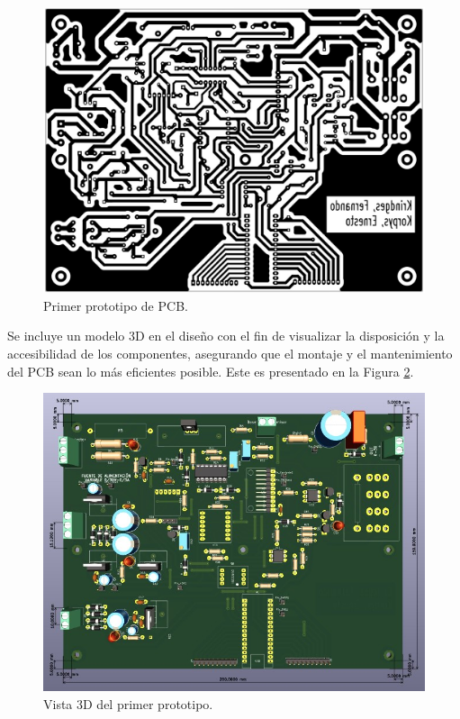 \begin{figure}[htbp]
    \centering
    \includegraphics[width=\textwidth]{./imagenes/pcb_v1.jpg}
    \caption{Primer prototipo de PCB.}
    \label{F:PCB_V1}
\end{figure} \par

Se incluye un modelo 3D en el diseño con el fin de visualizar la disposición y la accesibilidad de los componentes, asegurando que el montaje y el mantenimiento del PCB sean lo más eficientes posible. Este es presentado en la Figura \ref{F:PCB_3D}.\par 
\begin{figure}[htbp]
    \centering
    \includegraphics[width=\textwidth]{./imagenes/prototipo1.jpg}
    \caption{Vista 3D del primer prototipo.}
    \label{F:PCB_3D}
\end{figure} \par 

